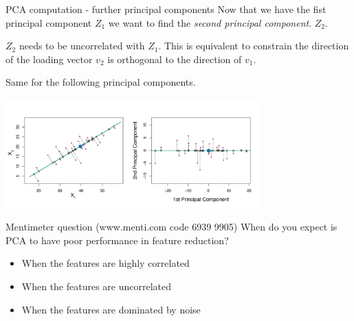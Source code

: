 \documentclass[notes]{beamer}          %
\begin{document}
\begin{frame}{PCA computation - further principal components}
Now that we have the fist principal component $Z_1$ we want to find the \textit{second principal component}. $Z_2$. 

\vspace{2mm} 

$Z_2$ needs to be uncorrelated with $Z_1$. This is equivalent to constrain the direction of the loading vector $v_2$  is orthogonal to the direction of $v_1$.

\vspace{2mm} 
 
 Same for the following principal components.
 
 \begin{center}
\includegraphics[height=4.2cm]{../figures/week_6/PCA_geometrical_part2.pdf}  
\end{center}
 

\end{frame}

\begin{frame}{Mentimeter question (www.menti.com code 6939 9905)}
When do you expect is PCA to have poor performance in feature reduction?
\begin{itemize}
\item When the features are highly correlated
\item When the features are uncorrelated
\item When the features are dominated by noise
\end{itemize}
\end{frame}
\end{document}
